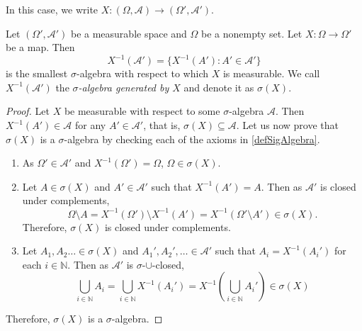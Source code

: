 In this case, we write $X:(\Omega,\mathcal{A})\to(\Omega',\mathcal{A}')$.

\begin{theorem}
    Let $(\Omega',\mathcal{A}')$ be a measurable space and $\Omega$ be a nonempty set. Let $X:\Omega\to\Omega'$ be a map. Then
    $$X^{-1}(\mathcal{A}')=\{X^{-1}(A'):A'\in\mathcal{A}'\}$$
    is the smallest $\sigma$-algebra with respect to which $X$ is measurable. We call $X^{-1}(\mathcal{A}')$ the \textit{$\sigma$-algebra generated by $X$} and denote it as $\sigma(X)$.
\end{theorem}
\begin{proof}
    Let $X$ be measurable with respect to some $\sigma$-algebra $\mathcal{A}$. Then $X^{-1}(A')\in\mathcal{A}$ for any $A'\in\mathcal{A}'$, that is, $\sigma(X)\subseteq\mathcal{A}$. Let us now prove that $\sigma(X)$ is a $\sigma$-algebra by checking each of the axioms in \cref{defSigAlgebra}.
    \begin{enumerate}
        \item As $\Omega'\in\mathcal{A}'$ and $X^{-1}(\Omega')=\Omega$, $\Omega\in\sigma(X)$.
        
        \item Let $A\in\sigma(X)$ and $A'\in\mathcal{A}'$ such that $X^{-1}(A')=A$. Then as $\mathcal{A}'$ is closed under complements,
        $$\Omega\setminus A = X^{-1}(\Omega')\setminus X^{-1}(A') = X^{-1}(\Omega'\setminus A')\in\sigma(X).$$
        Therefore, $\sigma(X)$ is closed under complements.
        
        \item Let $A_1,A_2\ldots\in\sigma(X)$ and $A_1',A_2',\ldots\in\mathcal{A}'$ such that $A_i=X^{-1}(A_i')$ for each $i\in\mathbb{N}$. Then as $\mathcal{A}'$ is $\sigma$-$\cup$-closed,
        $$\bigcup_{i\in\mathbb{N}} A_i = \bigcup_{i\in\mathbb{N}} X^{-1} (A_i') = X^{-1}\left(\bigcup_{i\in\mathbb{N}} A_i'\right) \in\sigma(X)$$
    \end{enumerate}
    Therefore, $\sigma(X)$ is a $\sigma$-algebra.
\end{proof}

